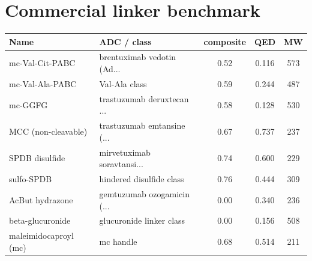\documentclass[10pt]{article}
\begin{document}
\section{Commercial linker benchmark}
\begin{longtable}{l l c c c}\toprule
Name & ADC / class & composite & QED & MW \\ \midrule\endhead
mc-Val-Cit-PABC & brentuximab vedotin (Ad... & 0.52 & 0.116 & 573 \\
mc-Val-Ala-PABC & Val-Ala class & 0.59 & 0.244 & 487 \\
mc-GGFG & trastuzumab deruxtecan ... & 0.58 & 0.128 & 530 \\
MCC (non-cleavable) & trastuzumab emtansine (... & 0.67 & 0.737 & 237 \\
SPDB disulfide & mirvetuximab soravtansi... & 0.74 & 0.600 & 229 \\
sulfo-SPDB & hindered disulfide class & 0.76 & 0.444 & 309 \\
AcBut hydrazone & gemtuzumab ozogamicin (... & 0.00 & 0.340 & 236 \\
beta-glucuronide & glucuronide linker class & 0.00 & 0.156 & 508 \\
maleimidocaproyl (mc) & mc handle & 0.68 & 0.514 & 211 \\
\bottomrule\end{longtable}
\end{document}
